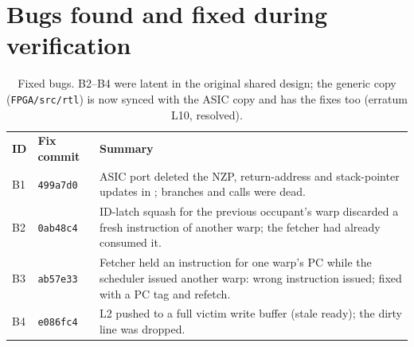 \documentclass[10pt,a4paper]{report}
\newcommand{\sig}[1]{\texttt{\detokenize{#1}}}
\newcommand{\rowcol}{\rowcolors{2}{rowgray}{white}}
\newcommand{\tblhead}[1]{\cellcolor{hdrgray}\sffamily\bfseries #1}
\begin{document}
\section{Bugs found and fixed during verification}
\begin{table}[ht]\centering\rowcol
\begin{tabular}{@{}llp{9.8cm}@{}}
\tblhead{ID} & \tblhead{Fix commit} & \tblhead{Summary}\\
B1 & \texttt{499a7d0} & ASIC port deleted the NZP, return-address and stack-pointer updates in \sig{pc.sv}; branches and calls were dead.\\
B2 & \texttt{0ab48c4} & ID-latch squash for the previous occupant's warp discarded a fresh instruction of another warp; the fetcher had already consumed it.\\
B3 & \texttt{ab57e33} & Fetcher held an instruction for one warp's PC while the scheduler issued another warp: wrong instruction issued; fixed with a PC tag and refetch.\\
B4 & \texttt{e086fc4} & L2 pushed to a full victim write buffer (stale ready); the dirty line was dropped.\\
\bottomrule
\end{tabular}
\caption{Fixed bugs. B2--B4 were latent in the original shared design; the generic copy (\texttt{FPGA/src/rtl}) is now synced with the ASIC copy and has the fixes too (erratum L10, resolved).}
\end{table}
\end{document}
